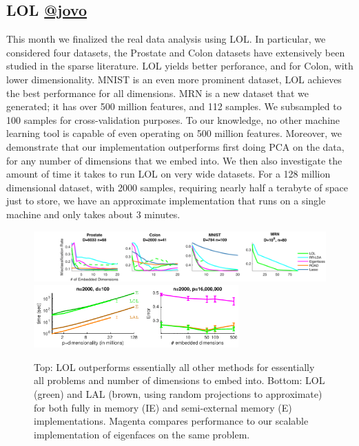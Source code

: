 \documentclass[simplex.tex]{subfiles}
\begin{document}
\subsection[LOL]{LOL \href{https://github.com/jovo}{@jovo}}

This month we finalized the real data analysis using LOL.  In particular, we considered four datasets, the Prostate and Colon datasets have extensively been studied in the sparse literature.  LOL yields better perforance, and for Colon, with lower dimensionality.  MNIST is an even more prominent dataset, LOL achieves the best performance for all dimensions.  MRN is a new dataset that we generated; it has over 500 million features, and 112 samples.  We subsampled to 100 samples for cross-validation purposes.  To our knowledge, no other machine learning tool is capable of even operating on 500 million features.  Moreover, we demonstrate that our implementation outperforms first doing PCA on the data, for any number of dimensions that we embed into.  We then also investigate the amount of time it takes to run LOL on very wide datasets.  For a 128 million dimensional dataset, with 2000 samples, requiring nearly half a terabyte of space just to store, we have an approximate implementation that runs on a single machine and only takes about 3 minutes.

\begin{figure}[h!]
\begin{cframed}
		\centering
		\includegraphics[width=1.0\textwidth]{../../figs/plot_real}
    \includegraphics[width=0.7\textwidth]{../../figs/scalability}
    \caption{Top: LOL outperforms essentially all other methods for essentially all problems and number of dimensions to embed into.  Bottom: LOL (green) and LAL (brown, using random projections to approximate) for both fully in memory (IE) and semi-external memory (E) implementations.  Magenta compares performance to our scalable implementation of eigenfaces on the same problem.   }
		\label{fig:all}
		\end{cframed}
\end{figure}


\clearpage
\end{document}
